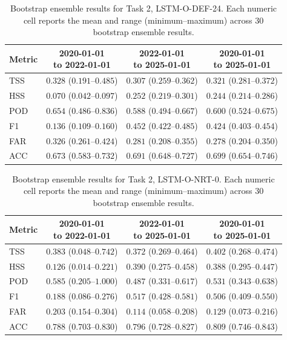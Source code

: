 \begin{table}[htbp]
\centering
\small
\caption{Bootstrap ensemble results for Task 2, LSTM-O-DEF-24. Each numeric cell reports the mean and range (minimum--maximum) across 30 bootstrap ensemble results.}
\label{tab:app-task2-lstm-o-def-24}
\begin{tabular}{lccc}
\toprule
Metric & \shortstack{2020-01-01\\to 2022-01-01} & \shortstack{2022-01-01\\to 2025-01-01} & \shortstack{2020-01-01\\to 2025-01-01} \\
\midrule
TSS & $0.328$ ($0.191$--$0.485$) & $0.307$ ($0.259$--$0.362$) & $0.321$ ($0.281$--$0.372$) \\
HSS & $0.070$ ($0.042$--$0.097$) & $0.252$ ($0.219$--$0.301$) & $0.244$ ($0.214$--$0.286$) \\
POD & $0.654$ ($0.486$--$0.836$) & $0.588$ ($0.494$--$0.667$) & $0.600$ ($0.524$--$0.675$) \\
F1 & $0.136$ ($0.109$--$0.160$) & $0.452$ ($0.422$--$0.485$) & $0.424$ ($0.403$--$0.454$) \\
FAR & $0.326$ ($0.261$--$0.424$) & $0.281$ ($0.208$--$0.355$) & $0.278$ ($0.204$--$0.350$) \\
ACC & $0.673$ ($0.583$--$0.732$) & $0.691$ ($0.648$--$0.727$) & $0.699$ ($0.654$--$0.746$) \\
\bottomrule
\end{tabular}
\end{table}
\clearpage

\begin{table}[htbp]
\centering
\small
\caption{Bootstrap ensemble results for Task 2, LSTM-O-NRT-0. Each numeric cell reports the mean and range (minimum--maximum) across 30 bootstrap ensemble results.}
\label{tab:app-task2-lstm-o-nrt-0}
\begin{tabular}{lccc}
\toprule
Metric & \shortstack{2020-01-01\\to 2022-01-01} & \shortstack{2022-01-01\\to 2025-01-01} & \shortstack{2020-01-01\\to 2025-01-01} \\
\midrule
TSS & $0.383$ ($0.048$--$0.742$) & $0.372$ ($0.269$--$0.464$) & $0.402$ ($0.268$--$0.474$) \\
HSS & $0.126$ ($0.014$--$0.221$) & $0.390$ ($0.275$--$0.458$) & $0.388$ ($0.295$--$0.447$) \\
POD & $0.585$ ($0.205$--$1.000$) & $0.487$ ($0.331$--$0.617$) & $0.531$ ($0.343$--$0.638$) \\
F1 & $0.188$ ($0.086$--$0.276$) & $0.517$ ($0.428$--$0.581$) & $0.506$ ($0.409$--$0.550$) \\
FAR & $0.203$ ($0.154$--$0.304$) & $0.114$ ($0.058$--$0.208$) & $0.129$ ($0.073$--$0.216$) \\
ACC & $0.788$ ($0.703$--$0.830$) & $0.796$ ($0.728$--$0.827$) & $0.809$ ($0.746$--$0.843$) \\
\bottomrule
\end{tabular}
\end{table}
\clearpage

